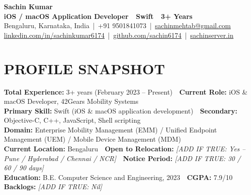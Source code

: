\documentclass[letterpaper,11pt]{article}
\begin{document}
\begin{center}
{\Huge \textbf{Sachin Kumar}} \\ \vspace{4pt}
{\large \textbf{iOS / macOS Application Developer \,\textbar\, Swift \,\textbar\, 3+ Years}} \\ \vspace{5pt}
\small
Bengaluru, Karnataka, India \,|\, +91 9501841073 \,|\,
\href{mailto:sachinmehtab@gmail.com}{sachinmehtab@gmail.com} \\ \vspace{2pt}
\href{https://linkedin.com/in/sachinkumar6174}{linkedin.com/in/sachinkumar6174} \,|\,
\href{https://github.com/sachin6174}{github.com/sachin6174} \,|\,
\href{https://www.sachinserver.in}{sachinserver.in}
\end{center}

\vspace{-2pt}

\section{PROFILE SNAPSHOT}
 \begin{itemize}[leftmargin=0.15in, label={}]
    \small{\item{
     \textbf{Total Experience:} 3+ years (February 2023 -- Present) \,\textbar\, \textbf{Current Role:} iOS \& macOS Developer, 42Gears Mobility Systems \\ \vspace{2pt}
     \textbf{Primary Skill:} Swift (iOS \& macOS application development) \,\textbar\, \textbf{Secondary:} Objective-C, C++, JavaScript, Shell scripting \\ \vspace{2pt}
     \textbf{Domain:} Enterprise Mobility Management (EMM) / Unified Endpoint Management (UEM) / Mobile Device Management (MDM) \\ \vspace{2pt}
     \textbf{Current Location:} Bengaluru \,\textbar\, \textbf{Open to Relocation:} \textit{[ADD IF TRUE: Yes -- Pune / Hyderabad / Chennai / NCR]} \,\textbar\, \textbf{Notice Period:} \textit{[ADD IF TRUE: 30 / 60 / 90 days]} \\ \vspace{2pt}
     \textbf{Education:} B.E. Computer Science and Engineering, 2023 \,\textbar\, \textbf{CGPA:} 7.9/10 \,\textbar\, \textbf{Backlogs:} \textit{[ADD IF TRUE: Nil]}
    }}
 \end{itemize}
\end{document}
